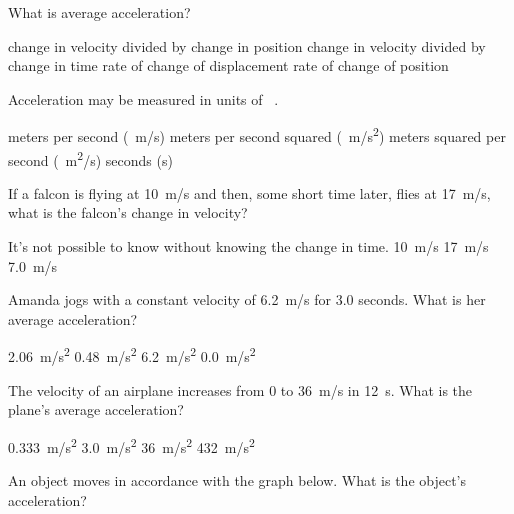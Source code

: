 \documentclass[../main-physics-problems.tex]{subfiles}
\begin{document}
\begin{questions}
\question
What is average acceleration?

\begin{choices}
    \choice change in velocity divided by change in position
    \correctchoice change in velocity divided by change in time
    \choice rate of change of displacement
    \choice rate of change of position
\end{choices}

\question
Acceleration may be measured in units of \fillin\ .

\begin{choices}
    \choice meters per second (\SI{}{m/s})
    \correctchoice meters per second squared (\SI{}{m/s^2})
    \choice meters squared per second (\SI{}{m^2/s})
    \choice seconds (s)
\end{choices}

\question
If a falcon is flying at \SI{10}{m/s} and then, some short time later, flies at \SI{17}{m/s}, what is the falcon's change in velocity?

\begin{choices}
    \choice It's not possible to know without knowing the change in time.
    \choice \SI{10}{m/s}
    \choice \SI{17}{m/s}
    \correctchoice \SI{7.0}{m/s}
\end{choices}

\question
Amanda jogs with a constant velocity of \SI{6.2}{m/s} for 3.0 seconds. What is her average acceleration?

\begin{choices}
    \choice \SI{2.06}{m/s^2}
    \choice \SI{0.48}{m/s^2}
    \choice \SI{6.2}{m/s^2}
    \correctchoice \SI{0.0}{m/s^2}
\end{choices}

\question %
The velocity of an airplane increases from 0 to \SI{36}{m/s} in \SI{12}{s}. What is the plane's average acceleration?

\begin{choices}
\choice \SI{0.333}{m/s^2}
\CorrectChoice \SI{3.0}{m/s^2}
\choice \SI{36}{m/s^2}
\choice \SI{432}{m/s^2}
\end{choices}

\question
An object moves in accordance with the graph below. What is the object's acceleration?
\vspace{1em}


\end{questions}
\end{document}
